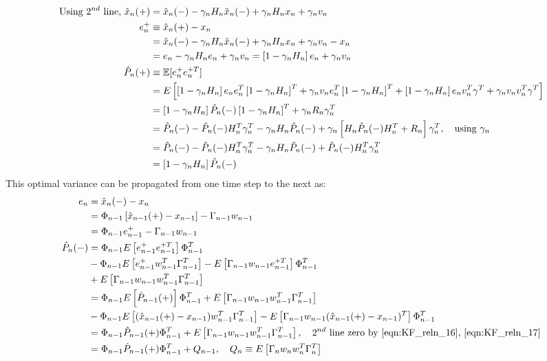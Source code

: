 \begin{align}
\text{Using $2^{nd}$ line, }\hat{x}_{n}(+) &=  \hat{x}_{n}(-) - \gamma_nH_n \hat{x}_{n}(-) + \gamma_nH_n x_n + \gamma_nv_n  \nonumber \\
e^{+}_n &\equiv \hat{x}_{n}(+) - x_n \\
&=  \hat{x}_{n}(-) - \gamma_nH_n \hat{x}_{n}(-) + \gamma_nH_n x_n + \gamma_nv_n - x_n \nonumber \\
&=  e_n - \gamma_nH_n e_n + \gamma_nv_n = \left[1 - \gamma_nH_n \right] e_n + \gamma_nv_n \nonumber \\
\hat{P}_{n}(+) &\equiv \mathbb{E}[e_n^+ e_n^{+T}] \\
& = E \left[ \left[1 - \gamma_nH_n \right] e_n e_n^T \left[1 - \gamma_nH_n \right]^T + \gamma_nv_n e_n^T \left[1 - \gamma_nH_n \right]^T   +  \left[1 - \gamma_nH_n \right] e_n v_n^T \gamma^T + \gamma_nv_n v_n^T \gamma^T \right] \\
& = \left[1 - \gamma_n H_n \right] \hat{P}_{n}(-)\left[1 - \gamma_n H_n \right]^T + \gamma_n R_n \gamma_n^T  \\
& =  \hat{P}_{n}(-) - \hat{P}_{n}(-)H_n^T\gamma_n^T - \gamma_n H_n \hat{P}_{n}(-) + \gamma_n \left[ H_n \hat{P}_{n}(-)H_n^T +  R_n \right] \gamma_n^T, \quad \text{using $\gamma_n$}\\
&= \hat{P}_{n}(-) - \hat{P}_{n}(-)H_n^T\gamma_n^T - \gamma_n H_n \hat{P}_{n}(-) +  \hat{P}_{n}(-)H_n^T \gamma_n^T  \\ 
&= \left[1  - \gamma_n H_n \right] \hat{P}_{n}(-) \label{eqn:KF_update_p+}
\end{align}
This optimal variance can be propagated from one time step to the next as:
\begin{align}
e_n &= \hat{x}_{n}(-) - x_n \\
&= \Phi_{n-1}\left[\hat{x}_{n-1}(+) - x_{n-1} \right] - \Gamma_{n-1}w_{n-1} \\
&= \Phi_{n-1}e^{+}_{n-1} - \Gamma_{n-1}w_{n-1} \\
\hat{P}_{n}(-) &= \Phi_{n-1}E\left[e^{+}_{n-1}e^{+T}_{n-1}\right]\Phi_{n-1}^T  \\
& - \Phi_{n-1}E\left[e^{+}_{n-1}w_{n-1}^T\Gamma_{n-1}^T\right] - E\left[\Gamma_{n-1}w_{n-1}e^{+T}_{n-1}\right]\Phi_{n-1}^T  \\
& + E\left[\Gamma_{n-1}w_{n-1}w_{n-1}^T\Gamma_{n-1}^T\right] \\
&= \Phi_{n-1}E\left[\hat{P}_{n-1}(+)\right]\Phi_{n-1}^T  + E\left[\Gamma_{n-1}w_{n-1}w_{n-1}^T\Gamma_{n-1}^T\right] \\
& - \Phi_{n-1}E\left[(\hat{x}_{n-1}(+) - x_{n-1})w_{n-1}^T\Gamma_{n-1}^T\right] - E\left[\Gamma_{n-1}w_{n-1}(\hat{x}_{n-1}(+) - x_{n-1})^T\right]\Phi_{n-1}^T  \\
&= \Phi_{n-1} \hat{P}_{n-1}(+) \Phi_{n-1}^T + E\left[\Gamma_{n-1}w_{n-1}w_{n-1}^T\Gamma_{n-1}^T\right], \quad \text{$2^{nd}$ line zero by \ref{eqn:KF_reln_16}, \ref{eqn:KF_reln_17}} \\
 &= \Phi_{n-1} \hat{P}_{n-1}(+) \Phi_{n-1}^T + Q_{n-1}, \quad Q_{n} \equiv E\left[\Gamma_{n}w_{n}w_{n}^T\Gamma_{n}^T\right] \label{eqn:KF_update_p-}
\end{align}
